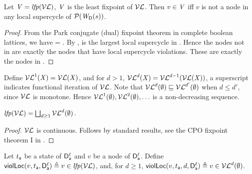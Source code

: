 \begin{proposition} \label{prop:LFPisLocScViolations}
Let  $\VS= \lfp{\lVFs}$, \ie $\VS$ is the least fixpoint of $\lVFs$. Then $v \in \VS$ iff 
$v$ is not a node in any local supercycle of $\lwfgS{B}{s}{\DS}$.
\end{proposition}
%
\begin{proof}
From the Park conjugate (dual) fixpoint theorem in complete boolean lattices, we have 
\lfp{\VFs} = \compl{\gfp{\SFs}}.
By , \gfp{\SFs} is the largest local supercycle in . Hence the nodes not in 
\gfp{\SFs} are exactly the nodes that have local supercycle violations. These are exactly the nodes in \lfp{\VFs}.
\end{proof}

Define $\lVFi{\XS}{1} = \lVF{\XS}$, and for $d > 1$, 
$\lVFi{\XS}{d} = \lVFi{\lVF{\XS}}{d-1}$, \ie a superscript indicates functional iteration
of $\lVFs$. Note that 
$\lVFi{\ewfg}{d} \subg \lVFi{\ewfg}{d'}$ when $d \le d'$, since $\lVFs$
is monotone.
Hence $\lVFi{\ewfg}{1}, \lVFi{\ewfg}{2}, \ldots$ is a non-decreasing sequence.

\begin{proposition} \label{prop:computeLocLFP}
$\lfp{\lVFs} = \JOIN_{d \ge 1} \lVFs^{d} (\ewfg)$.
\end{proposition}
%
\begin{proof}
$\lVFs$ is continuous. Follows by standard results, \eg see the CPO fixpoint theorem I in 
\cite{DP02}.
\end{proof}










\begin{definition}
\label{def:supercycle.violation.local}
\label{defn:supercycle.violation.local}
Let $t_\act$ be a state of $\dsk{\act}{\l}$ and $v$ be a node of $\dsk{\act}{\l}$.
Define 
$\scVL{v}{t_\act}{\act}{\l} \df v \in \lfp{\lVFs}$,
and, for $d \ge 1$, $\scVLd{v}{d}{t_\act}{\act}{\l} \df v \in \lVFs^{d} (\ewfg)$.
\end{definition}

